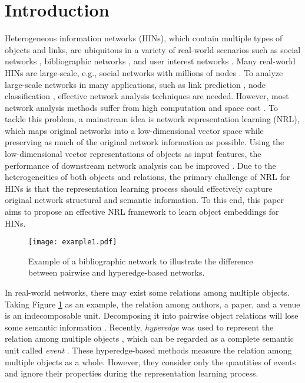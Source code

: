 \section{Introduction}
Heterogeneous information networks (HINs), which contain multiple types of objects and links, are ubiquitous in a variety of real-world scenarios such as social networks \cite{jiang2017semi}, bibliographic networks \cite{sun2011pathsim}, and user interest networks \cite{chen2018heterogeneous}. Many real-world HINs are large-scale, e.g., social networks with millions of nodes \cite{ellison2007benefits}. To analyze large-scale networks in many applications, such as link prediction \cite{zhang2013predicting,zhang2015diffusion}, node classification \cite{ji2011ranking,jacob2014learning}, effective network analysis techniques are needed. However, most network analysis methods suffer from high computation and space cost \cite{cai2018comprehensive}. To tackle this problem, a mainstream idea is network representation learning (NRL), which maps original networks into a low-dimensional vector space while preserving as much of the original network information as possible. Using the low-dimensional vector representations of objects as input features, the performance of downstream network analysis can be improved \cite{cai2018comprehensive}. Due to the heterogeneities of both objects and relations, the primary challenge of NRL for HINs is that the representation learning process should effectively capture original network structural and semantic information. To this end, this paper aims to propose an effective NRL framework to learn object embeddings for HINs.

\begin{figure}
	\centering
	\texttt{[image: example1.pdf]}
	\caption{{\small Example of a bibliographic network to illustrate the difference between pairwise and hyperedge-based networks.}}\label{figure1}
\end{figure}

In real-world networks, there may exist some relations among multiple objects. Taking Figure \ref{figure1} as an example, the relation among authors, a paper, and a venue is an indecomposable unit. Decomposing it into pairwise object relations will lose some semantic information \cite{tu2017structural}. Recently, {\itshape hyperedge} was used to represent the relation among multiple objects \cite{gui2017embedding,tu2017structural}, which can be regarded as a complete semantic unit called {\itshape event} \cite{gui2017embedding}. These hyperedge-based methods measure the relation among multiple objects as a whole. However, they consider only the quantities of events and ignore their properties during the representation learning process.

